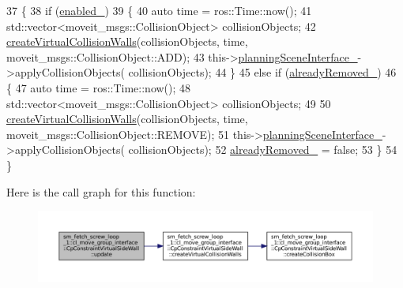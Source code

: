 \begin{DoxyCode}
37         \{
38             \textcolor{keywordflow}{if} (\hyperlink{classsm__fetch__screw__loop__1_1_1cl__move__group__interface_1_1CpConstraintVirtualSideWall_a9d17ffd44fe6739ea5e5e4113d470a60}{enabled\_})
39             \{
40                 \textcolor{keyword}{auto} time = ros::Time::now();
41                 std::vector<moveit\_msgs::CollisionObject> collisionObjects;
42                 \hyperlink{classsm__fetch__screw__loop__1_1_1cl__move__group__interface_1_1CpConstraintVirtualSideWall_acbe325c0c6fb25e10efddb9be7e672d1}{createVirtualCollisionWalls}(collisionObjects, time, 
      moveit\_msgs::CollisionObject::ADD);
43                 this->\hyperlink{classsm__fetch__screw__loop__1_1_1cl__move__group__interface_1_1CpConstraintVirtualSideWall_a36d055e567438938c2355ad5ee081498}{planningSceneInterface\_}->applyCollisionObjects(
      collisionObjects);
44             \}
45             \textcolor{keywordflow}{else} \textcolor{keywordflow}{if} (\hyperlink{classsm__fetch__screw__loop__1_1_1cl__move__group__interface_1_1CpConstraintVirtualSideWall_aabc81a5e528f1e9c72e2ee12c4a9740f}{alreadyRemoved\_})
46             \{
47                 \textcolor{keyword}{auto} time = ros::Time::now();
48                 std::vector<moveit\_msgs::CollisionObject> collisionObjects;
49 
50                 \hyperlink{classsm__fetch__screw__loop__1_1_1cl__move__group__interface_1_1CpConstraintVirtualSideWall_acbe325c0c6fb25e10efddb9be7e672d1}{createVirtualCollisionWalls}(collisionObjects, time, 
      moveit\_msgs::CollisionObject::REMOVE);
51                 this->\hyperlink{classsm__fetch__screw__loop__1_1_1cl__move__group__interface_1_1CpConstraintVirtualSideWall_a36d055e567438938c2355ad5ee081498}{planningSceneInterface\_}->applyCollisionObjects(
      collisionObjects);
52                 \hyperlink{classsm__fetch__screw__loop__1_1_1cl__move__group__interface_1_1CpConstraintVirtualSideWall_aabc81a5e528f1e9c72e2ee12c4a9740f}{alreadyRemoved\_} = \textcolor{keyword}{false};
53             \}
54         \}
\end{DoxyCode}
Here is the call graph for this function\+:
\nopagebreak
\begin{figure}[H]
\begin{center}
\leavevmode
\includegraphics[width=350pt]{classsm__fetch__screw__loop__1_1_1cl__move__group__interface_1_1CpConstraintVirtualSideWall_a86d9dd2c82600e9b175ee0e456c797a8_cgraph}
\end{center}
\end{figure}
